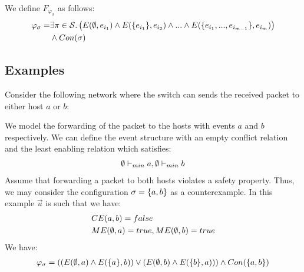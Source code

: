 \documentclass{article}
\begin{document}
We define $F_{\varphi_{\sigma}}$ as follows:
\begin{align*}
    \varphi_{\sigma} = &
    \exists \pi \in \mathcal{S}.
    \left(
    E(\emptyset, e_{i_1})
    \wedge E(\{e_{i_1}\}, e_{i_2} )
    \wedge ...
    \wedge E(\{e_{i_1},...,e_{i_{m-1}}\},e_{i_m})
    \right)
    \\
                       & \wedge Con(\sigma)
\end{align*}

\subsection{Examples}
\begin{example}
    Consider the following network where the switch can sends the
    received packet to either host $a$ or $b$:
    \begin{center}
    \end{center}
    We model the forwarding of the packet to the hosts with events
    $a$ and $b$ respectively.
    We can define the event structure with an empty conflict relation and the least enabling relation which satisfies:
    \begin{align*}
        \emptyset \vdash_{min} a, \emptyset \vdash_{min} b
    \end{align*}
    Assume that forwarding a packet to both hosts violates
    a safety property.
    Thus, we may consider the configuration $\sigma = \{a,b\}$ as
    a counterexample.
    In this example $\vec u$ is such that we have:
    \begin{align*}
         & CE(a,b) = false                   \\
         & ME(\emptyset, a) = true, ME(\emptyset,b) = true \\
    \end{align*}
    We have:
    \begin{align*}
        \varphi_{\sigma} & =
        \left(
        \left( E(\e, a) \wedge E(\s{a},b) \right)
        \vee
        \left( E(\e,b) \wedge E(\s{b},a) \right)
        \right)
        \wedge Con(\s{a,b})                                                      \\

\end{align*}
\end{example}
\end{document}
